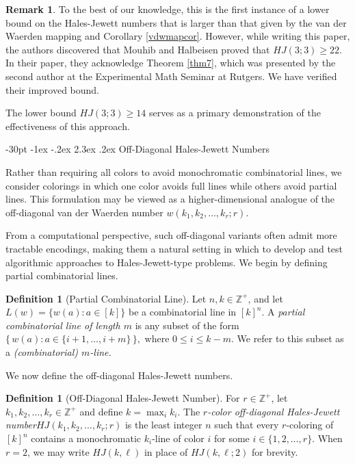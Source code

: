 \documentclass[11pt]{article}
\makeatletter
\theoremstyle{definition}
\newtheorem{defn}[thm]{Definition}
\newtheorem{rem}[thm]{Remark}
\renewcommand\section{\@startsection {section}{1}{\z@}%
{-30pt \@plus -1ex \@minus -.2ex}%
{2.3ex \@plus.2ex}%
{\normalfont\normalsize\bfseries}}
\makeatother
\begin{document}
\begin{rem}
     To the best of our knowledge, this is the first
instance of a lower bound on the Hales-Jewett numbers that is larger
than that given by the van der Waerden mapping and Corollary \ref{vdwmapcor}.
However, while writing this paper, the authors
discovered that Mouhib and Halbeisen \cite{MH}
proved that $HJ(3;3) \geq 22.$ In their paper,
they acknowledge Theorem \ref{thm7}, which was
presented by the second author at the Experimental Math Seminar at Rutgers.  We have
verified their improved bound.
\end{rem}

The lower bound $HJ(3;3) \geq 14$ serves as a primary demonstration of the effectiveness of this approach.

\section{Off-Diagonal Hales-Jewett Numbers}

Rather than requiring all colors to avoid monochromatic combinatorial lines, we consider colorings in which one color avoids full lines while others avoid partial lines. This formulation may be viewed as a higher-dimensional analogue of the off-diagonal van der Waerden number $w(k_1,k_2,\dots,k_r;r)$.

From a computational perspective, such off-diagonal variants often admit more tractable encodings, making them a natural setting in which to develop and test algorithmic approaches to Hales-Jewett-type problems. We begin by defining partial combinatorial lines.

\begin{defn}[Partial Combinatorial Line]
Let $n,k \in \mathbb{Z}^+$, and let $L(w)=\{w(a):a\in[k]\}$ be a combinatorial line in $[k]^n$.  
A \emph{partial combinatorial line of length $m$} is any subset of the form
$
\{\,w(a): a \in \{i+1,\dots,i+m\}\,\},
$
where $0 \le i \le k-m$. We refer to this subset as a \textit{(combinatorial) $m$-line.}
\end{defn}


We now define the off-diagonal Hales-Jewett numbers.

\begin{defn}[Off-Diagonal Hales-Jewett Number]\label{def11}
For $r \in \mathbb{Z}^+$, let $k_1,k_2,  \dots, k_r \in \mathbb{Z}^+$
and define $k = \max_i k_i$.
The \emph{$r$-color off-diagonal Hales-Jewett number}\break$HJ(k_1,k_2,\dots,k_r;r)$ is the least integer $n$ such that every $r$-coloring of $[k]^n$ contains  
a monochromatic $k_i$-line of color $i$ for some $i \in \{1,2,\dots,r\}$.
When $r = 2$, we may write $HJ(k,\ell)$ in place of $HJ(k,\ell;2)$ for brevity.
\end{defn}
\end{document}
